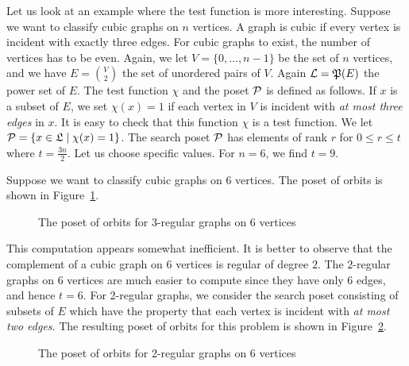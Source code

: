 \bigskip



Let us look at an example where the test function is more interesting.
Suppose we want to classify cubic graphs on $n$ vertices. 
A graph is cubic if every vertex is incident with exactly three edges. 
For cubic graphs to exist, the number of vertices has to be even.
Again, we let $V = \{0,\ldots,n-1\}$ be the set of $n$ vertices, and we have  
$E = {V \choose 2}$ the set of unordered pairs of $V.$ 
Again ${\cal L} = {\mathfrak P}(E)$ the power set of $E$. 
The test function $\chi$ and the poset ${\cal P}$ is defined as follows. 
If $x$ is a subset of $E$, we set $\chi(x) = 1$ 
if each vertex in $V$ 
is incident with {\em at most three edges} in $x.$
It is easy to check that this function $\chi$ is a test function. 
We let ${\cal P} = \{ x \in {\mathfrak L} \mid \chi(x) = 1 \}$. 
The search poset ${\cal P}$ has elements of rank $r$ for $0 \le r \le t$ 
where $t = \frac{3n}{2}.$ 
Let us choose specific values. For $n = 6$, we find $t=9.$

\bigskip


Suppose we want to classify cubic graphs on $6$ vertices. 
The poset of orbits is shown in Figure~\ref{posetcubicsix}.
\begin{figure}
\begin{center}
 
\end{center}
\caption{\label{posetcubicsix}The poset of orbits for 3-regular graphs on 6 vertices}
\end{figure}


\bigskip



This computation appears somewhat inefficient. It is better to observe 
that the complement of a cubic graph on $6$ vertices is regular of degree $2.$
The $2$-regular graphs on $6$ vertices are much easier to compute since they have only $6$ edges, and hence $t=6.$ 
For 2-regular graphs, 
we consider the search poset consisting of subsets of $E$ 
which have the property that 
each vertex is incident with {\em at most two edges}.
The resulting poset of orbits for this problem is shown in Figure~\ref{posetcubicsixcomplement}.
\begin{figure}
\begin{center}
 
\end{center}
\caption{\label{posetcubicsixcomplement}The poset of orbits for 2-regular graphs on 6 vertices}
\end{figure}




